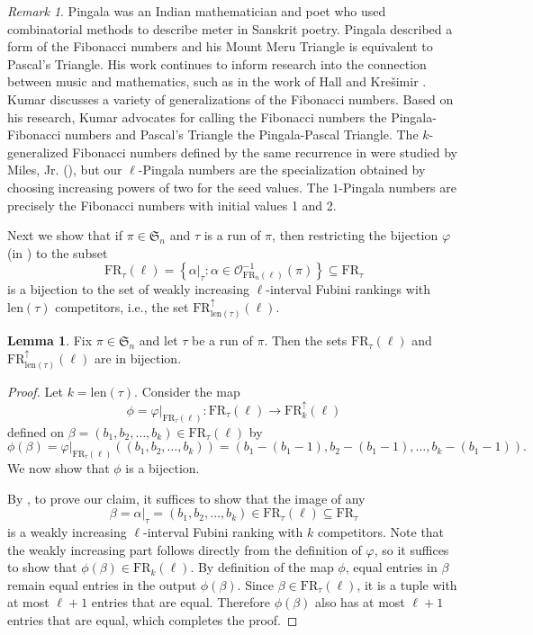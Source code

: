 \documentclass{amsart}
\theoremstyle{definition}
\newtheorem{lemma}{Lemma}[section]
\theoremstyle{definition}
\theoremstyle{remark}
\newtheorem{remark}{Remark}[section]
\newcommand{\FR}[1]{\mathrm{FR}_{#1}}
\newcommand{\out}{\mathcal{O}}
\newcommand{\len}{\mathrm{len}}
\newcommand{\Sym}{\mathfrak{S}}
\begin{document}
\begin{remark}  \label{remark:Pingala} 
Pingala was an Indian mathematician and poet who used combinatorial methods to describe meter in Sanskrit poetry. Pingala described a form of the Fibonacci numbers and his Mount Meru Triangle is equivalent to Pascal's Triangle. His work continues to inform research into the connection between music and mathematics, such as in the work of Hall and Kre\v{s}imir \cite{MR1836944}. Kumar \cite{Kumar2021FibonacciSG} discusses a variety of generalizations of the Fibonacci numbers. Based on his research, Kumar advocates for calling the Fibonacci numbers the Pingala-Fibonacci numbers and Pascal's Triangle the Pingala-Pascal Triangle. The $k$-generalized Fibonacci numbers defined by the same recurrence in  were studied by Miles, Jr. (\cite{kfibonacci}), but our $\ell$-Pingala numbers are the specialization obtained by choosing increasing powers of two for the seed values. The $1$-Pingala numbers are precisely the Fibonacci numbers with initial values 1 and 2.
\end{remark} 

Next we show that if $\pi\in\Sym_n$ and $\tau$ is a run of $\pi$, then restricting the bijection $\varphi$ (in ) to the subset 
\[\FR{\tau}(\ell)=\left\{\alpha|_{\tau}:\alpha\in\out_{\FR{n}(\ell)}^{-1}
(\pi)\right\}\subseteq\FR{\tau}\]
is a bijection to the set of weakly increasing $\ell$-interval Fubini rankings with $\len(\tau)$ competitors, i.e., the set $\FR{\len(\tau)}^\uparrow(\ell)$.
\begin{lemma}\label{restricting to ell-interval is still cool}
Fix $\pi\in\Sym_n$ and let $\tau$ be a run of $\pi$. Then the sets $\FR{\tau}(\ell)$ and $\FR{\len(\tau)}^{\uparrow}(\ell)$ are in bijection.
\end{lemma}
\begin{proof}
    Let $k = \len(\tau)$. 
    Consider the map \[\phi=\varphi|_{\FR{\tau}(\ell)}:\FR{\tau}(\ell)\to \FR{k}^\uparrow(\ell)\]
    defined on $\beta=(b_1,b_2,\ldots,b_k)\in \FR{\tau}(\ell)$
    by
    \[\phi(\beta) = \varphi|_{\FR{\tau}(\ell)}((b_1, b_2, \ldots, b_k)) = (b_1 - (b_1-1), b_2 - (b_1-1), \ldots, b_k - (b_1-1)).\]
    We now show that $\phi$
    is a bijection.

    By , to prove our claim, it suffices to show that the image of any 
    \[\beta=\alpha|_\tau=(b_1,b_2,\ldots,b_k)\in\FR{\tau}(\ell)\subseteq\FR{\tau}\] is a weakly increasing $\ell$-interval Fubini ranking with $k$ competitors. 
    Note that the weakly increasing part follows directly from the definition of $\varphi$, so it suffices to show that $\phi(\beta)\in\FR{k}(\ell)$.
By definition of the map $\phi$, equal entries in $\beta$ remain equal entries in the output $\phi(\beta)$. 
Since $\beta\in\FR{\tau}(\ell)$, 
    it is a tuple with at most $\ell+1$
entries that are equal. Therefore $\phi(\beta)$ also has at most $\ell+1$ entries that are equal, which completes the proof.
\end{proof}
\end{document}
